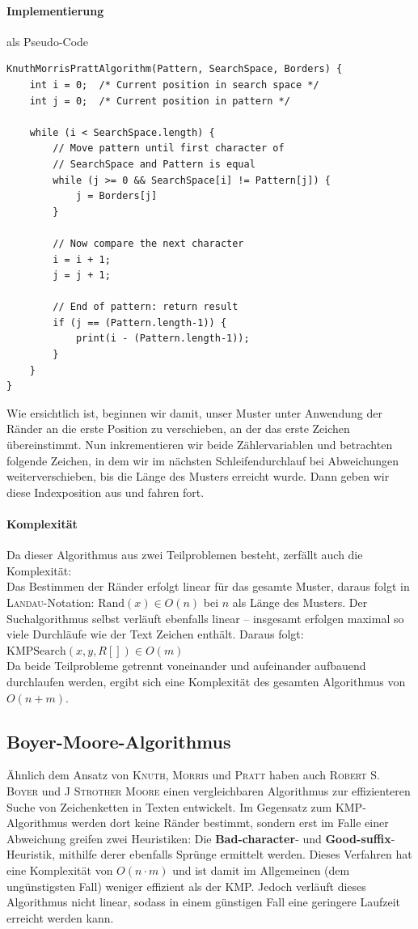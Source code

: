 \documentclass[11pt,a4paper]{scrartcl}
\begin{document}
\paragraph{Implementierung}
als Pseudo-Code
\begin{lstlisting}
KnuthMorrisPrattAlgorithm(Pattern, SearchSpace, Borders) {
	int i = 0;	/* Current position in search space */
	int j = 0;	/* Current position in pattern */

	while (i < SearchSpace.length) {
		// Move pattern until first character of 
		// SearchSpace and Pattern is equal
		while (j >= 0 && SearchSpace[i] != Pattern[j]) {
			j = Borders[j]		
		} 
		
		// Now compare the next character
		i = i + 1;
		j = j + 1;

		// End of pattern: return result		
		if (j == (Pattern.length-1)) {
			print(i - (Pattern.length-1));		
		}
	}
}
\end{lstlisting}
Wie ersichtlich ist, beginnen wir damit, unser Muster unter Anwendung der Ränder an die erste Position zu verschieben, an der das erste Zeichen übereinstimmt. Nun inkrementieren wir beide Zählervariablen und betrachten folgende Zeichen, in dem wir im nächsten Schleifendurchlauf bei Abweichungen weiterverschieben, bis die Länge des Musters erreicht wurde. Dann geben wir diese Indexposition aus und fahren fort. 
\paragraph{Komplexität} 
Da dieser Algorithmus aus zwei Teilproblemen besteht, zerfällt auch die Komplexität: \\
Das Bestimmen der Ränder erfolgt linear für das gesamte Muster, daraus folgt in \textsc{Landau}-Notation: $\text{Rand}(x) \in O(n)$ bei $n$ als Länge des Musters.
Der Suchalgorithmus selbst verläuft ebenfalls linear -- insgesamt erfolgen maximal so viele Durchläufe wie der Text Zeichen enthält. Daraus folgt: $\text{KMPSearch}(x, y, R[]) \in O(m)$ \\
Da beide Teilprobleme getrennt voneinander und aufeinander aufbauend durchlaufen werden, ergibt sich eine Komplexität des gesamten Algorithmus von $O(n + m)$. \parencite{KMPRand}
\subsection{Boyer-Moore-Algorithmus}
Ähnlich dem Ansatz von \textsc{Knuth}, \textsc{Morris} und \textsc{Pratt} haben auch \textsc{Robert S. Boyer} und \textsc{J Strother Moore} einen vergleichbaren Algorithmus zur effizienteren Suche von Zeichenketten in Texten entwickelt. Im Gegensatz zum KMP-Algorithmus werden dort keine Ränder bestimmt, sondern erst im Falle einer Abweichung greifen zwei Heuristiken: Die \textbf{Bad-character}- und \textbf{Good-suffix}-Heuristik, mithilfe derer ebenfalls Sprünge ermittelt werden. Dieses Verfahren hat eine Komplexität von $O(n \cdot m)$ und ist damit im Allgemeinen (dem ungünstigsten Fall) weniger effizient als der KMP. Jedoch verläuft dieses Algorithmus nicht linear, sodass in einem günstigen Fall eine geringere Laufzeit erreicht werden kann. \\\\
\end{document}

